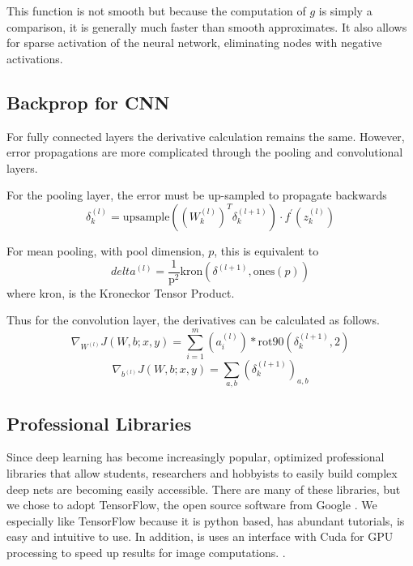 \documentclass[12pt, twocolumn]{article}
\begin{document}
This function is not smooth but because the computation of $g$ is simply a comparison, it is generally much faster than smooth approximates. It also allows for sparse activation of the neural network, eliminating nodes with negative activations. 

\subsection{Backprop for CNN}
For fully connected layers  the derivative calculation remains the same. However,  error propagations are more complicated through the pooling and convolutional layers. 

For the pooling layer, the error must be up-sampled to propagate backwards
\begin{equation}
\delta^{(l)}_k=\textrm{upsample}((W^{(l)}_k)^T \delta^{(l+1)}_k) \cdot f^{\prime}(z^{(l)}_k)
\end{equation}


For mean pooling, with pool dimension, $p$, this is equivalent to 
\begin{equation}
delta^{(l)}= \frac{1}{\textrm{p}^2}  \textrm{kron}(\delta^{(l+1)}, \textrm{ones}(p))
\end{equation}
where kron, is the Kroneckor Tensor Product.

Thus for the convolution layer, the derivatives can be calculated as follows.
\begin{equation}
\nabla_{W^{(l)}}J(W,b;x,y) = \sum_{i=1}^m (a^{(l)}_i) \ast \textrm{rot90}( \delta^{(l+1)}_k,2)
\end{equation}
\begin{equation}
\nabla_{b^{(l)}}J(W,b;x,y)= \sum_{a,b}(\delta^{(l+1)}_k)_{a,b}
\end{equation}


\subsection{Professional Libraries}

Since deep learning has become increasingly popular, optimized professional libraries that allow students, researchers and hobbyists to easily build complex deep nets are becoming easily accessible. There are many of these libraries, but we chose to adopt TensorFlow, the open source software from Google \cite{TensorFlowGH}. We especially like TensorFlow because it is python based, has abundant tutorials, is easy and intuitive to use. In addition, is uses an interface with Cuda for GPU processing to speed up results for image computations. \cite{TensorFlowWeb}. 
\end{document}
